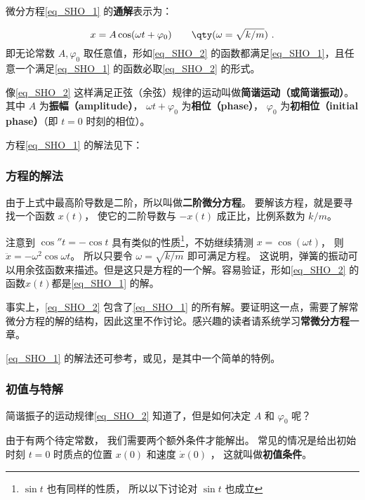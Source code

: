 微分方程\autoref{eq_SHO_1} 的\textbf{通解}表示为：

\begin{equation}\label{eq_SHO_2}
x = A\cos(\omega t + \varphi_0)  \qquad \qty(\omega  = \sqrt{k/m})~.
\end{equation}
即无论常数 $A, \varphi_0$ 取任意值，形如\autoref{eq_SHO_2} 的函数都满足\autoref{eq_SHO_1}，且任意一个满足\autoref{eq_SHO_1} 的函数必取\autoref{eq_SHO_2} 的形式。

像\autoref{eq_SHO_2} 这样满足正弦（余弦）规律的运动叫做\textbf{简谐运动（或简谐振动）}。其中 $A$ 为\textbf{振幅（amplitude）}， $\omega t + \varphi_0$ 为\textbf{相位（phase）}， $\varphi_0$ 为\textbf{初相位（initial phase）}（即 $t = 0$ 时刻的相位）。 


方程\autoref{eq_SHO_1} 的解法见下：



\subsubsection{方程的解法}

由于上式中最高阶导数是二阶，所以叫做\textbf{二阶微分方程}。 要解该方程，就是要寻找一个函数 $x(t)$， 使它的二阶导数与 $- x(t)$ 成正比，比例系数为 $k/m$。 

注意到 $\cos'' t =  - \cos t$ 具有类似的性质\footnote{$\sin t$ 也有同样的性质， 所以以下讨论对 $\sin t$ 也成立}，不妨继续猜测 $x = \cos(\omega t)$， 则 $\ddot x =  - {\omega ^2}\cos \omega t$。 所以只要令 $\omega = \sqrt{k/m}$ 即可满足方程。 这说明，弹簧的振动可以用余弦函数来描述。但是这只是方程的一个解。容易验证，形如\autoref{eq_SHO_2} 的函数$x(t)$都是\autoref{eq_SHO_1} 的解。

事实上，\autoref{eq_SHO_2}  包含了\autoref{eq_SHO_1}  的所有解。要证明这一点，需要了解常微分方程的解的结构，因此这里不作讨论。感兴趣的读者请系统学习\textbf{常微分方程}一章。

\autoref{eq_SHO_1} 的解法还可参考，或见，是其中一个简单的特例。


\subsubsection{初值与特解}


简谐振子的运动规律\autoref{eq_SHO_2} 知道了，但是如何决定 $A$ 和 $\varphi_0$ 呢？ 

由于有两个待定常数， 我们需要两个额外条件才能解出。 常见的情况是给出初始时刻 $t = 0$ 时质点的位置 $x(0)$ 和速度 $\dot x(0)$ ， 这就叫做\textbf{初值条件}。

